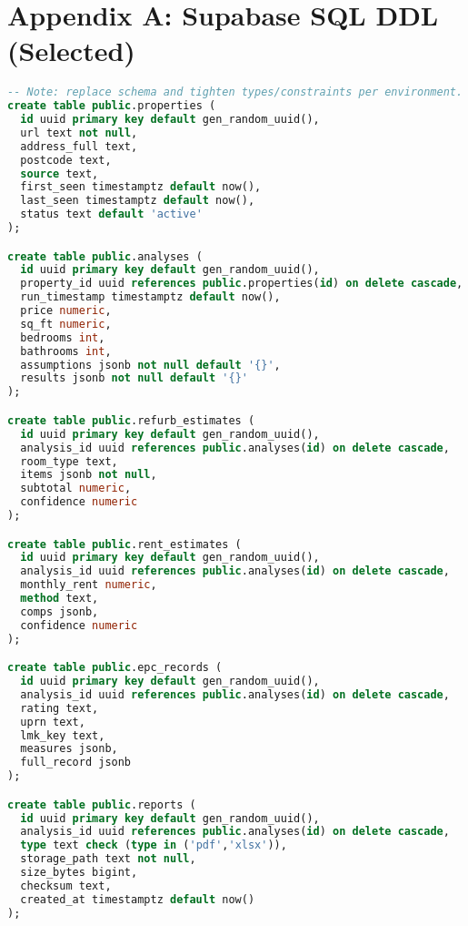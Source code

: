 \documentclass[12pt,a4paper]{article}
\begin{document}
\appendix
\section*{Appendix A: Supabase SQL DDL (Selected)}
\begin{lstlisting}[language=SQL]
-- Note: replace schema and tighten types/constraints per environment.
create table public.properties (
  id uuid primary key default gen_random_uuid(),
  url text not null,
  address_full text,
  postcode text,
  source text,
  first_seen timestamptz default now(),
  last_seen timestamptz default now(),
  status text default 'active'
);

create table public.analyses (
  id uuid primary key default gen_random_uuid(),
  property_id uuid references public.properties(id) on delete cascade,
  run_timestamp timestamptz default now(),
  price numeric,
  sq_ft numeric,
  bedrooms int,
  bathrooms int,
  assumptions jsonb not null default '{}',
  results jsonb not null default '{}'
);

create table public.refurb_estimates (
  id uuid primary key default gen_random_uuid(),
  analysis_id uuid references public.analyses(id) on delete cascade,
  room_type text,
  items jsonb not null,
  subtotal numeric,
  confidence numeric
);

create table public.rent_estimates (
  id uuid primary key default gen_random_uuid(),
  analysis_id uuid references public.analyses(id) on delete cascade,
  monthly_rent numeric,
  method text,
  comps jsonb,
  confidence numeric
);

create table public.epc_records (
  id uuid primary key default gen_random_uuid(),
  analysis_id uuid references public.analyses(id) on delete cascade,
  rating text,
  uprn text,
  lmk_key text,
  measures jsonb,
  full_record jsonb
);

create table public.reports (
  id uuid primary key default gen_random_uuid(),
  analysis_id uuid references public.analyses(id) on delete cascade,
  type text check (type in ('pdf','xlsx')),
  storage_path text not null,
  size_bytes bigint,
  checksum text,
  created_at timestamptz default now()
);
\end{lstlisting}
\end{document}
